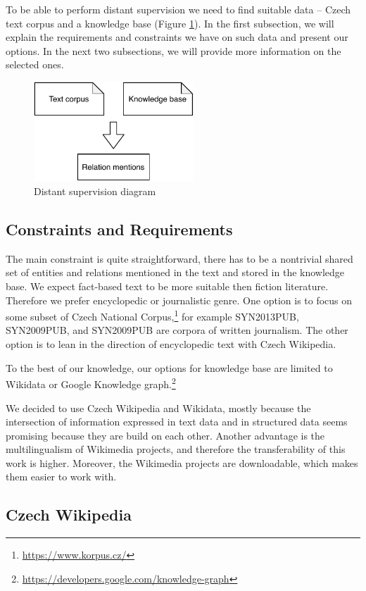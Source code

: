 To be able to perform distant supervision we need to find suitable data -- Czech text corpus and a knowledge base (Figure \ref{obr03:DSD}). In the first subsection, we will explain the requirements and constraints we have on such data and present our options. In the next two subsections, we will provide more information on the selected ones.

\begin{figure}[h]\centering
\includegraphics[width=60mm]{./img//Diplomka diagramy-Distant supervision}
\caption{Distant supervision diagram}
\label{obr03:DSD}
\end{figure}


\subsection{Constraints and Requirements}
The main constraint is quite straightforward, there has to be a nontrivial shared set of entities and relations mentioned in the text and stored in the knowledge base. We expect fact-based text to be more suitable then fiction literature. Therefore we prefer encyclopedic or journalistic genre. One option is to focus on some subset of Czech National Corpus,\footnote{\url{https://www.korpus.cz/}} for example SYN2013PUB, SYN2009PUB, and SYN2009PUB are corpora of written journalism. The other option is to lean in the direction of encyclopedic text with Czech Wikipedia.

To the best of our knowledge, our options for knowledge base are limited to Wikidata or Google Knowledge graph.\footnote{\url{https://developers.google.com/knowledge-graph}}

We decided to use Czech Wikipedia and Wikidata, mostly because the intersection of information expressed in text data and in structured data seems promising because they are build on each other. Another advantage is the multilingualism of Wikimedia projects, and therefore the transferability of this work is higher. Moreover, the Wikimedia projects are downloadable, which makes them easier to work with.


\subsection{Czech Wikipedia}

